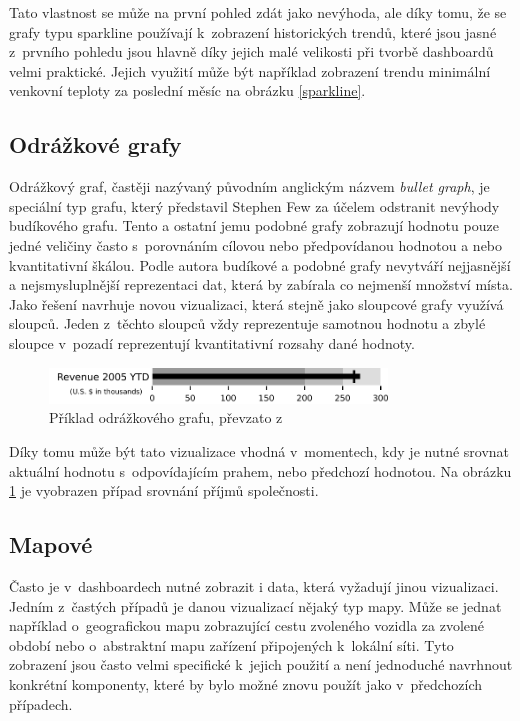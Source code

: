 Tato vlastnost se může na první pohled zdát jako nevýhoda, ale díky tomu, že se grafy typu sparkline používají k~zobrazení historických trendů, které jsou jasné z~prvního pohledu jsou hlavně díky jejich malé velikosti při tvorbě dashboardů velmi praktické. Jejich využití může být například zobrazení trendu minimální venkovní teploty za poslední měsíc na obrázku \ref{sparkline}.

\subsection*{Odrážkové grafy}
Odrážkový graf, častěji nazývaný původním anglickým názvem \textit{bullet graph}, je speciální typ grafu, který představil Stephen Few \cite{few2004dashboard} za účelem odstranit nevýhody budíkového grafu. Tento a ostatní jemu podobné grafy zobrazují hodnotu pouze jedné veličiny často s~porovnáním cílovou nebo předpovídanou hodnotou a nebo kvantitativní škálou. Podle autora budíkové a podobné grafy nevytváří nejjasnější a nejsmysluplnější reprezentaci dat, která by zabírala co nejmenší množství místa. Jako řešení navrhuje novou vizualizaci, která stejně jako sloupcové grafy využívá sloupců. Jeden z~těchto sloupců vždy reprezentuje samotnou hodnotu a zbylé sloupce v~pozadí reprezentují kvantitativní rozsahy dané hodnoty.

\begin{figure}[H]
\label{Bullet_Graph_Example}
\begin{center}
    \includegraphics[width=0.8\textwidth]{obrazky-figures/Bullet_Graph_Example.pdf}
\end{center}
\caption{Příklad odrážkového grafu, převzato z~\cite{few2004dashboard}}
\end{figure}

Díky tomu může být tato vizualizace vhodná v~momentech, kdy je nutné srovnat aktuální hodnotu s~odpovídajícím prahem, nebo předchozí hodnotou. Na obrázku \ref{Bullet_Graph_Example} je vyobrazen případ srovnání příjmů společnosti.

\subsection*{Mapové}
Často je v~dashboardech nutné zobrazit i data, která vyžadují jinou vizualizaci. Jedním z~častých případů je danou vizualizací nějaký typ mapy. Může se jednat například o~geografickou mapu zobrazující cestu zvoleného vozidla za zvolené období nebo o~abstraktní mapu zařízení připojených k~lokální síti. Tyto zobrazení jsou často velmi specifické k~jejich použití a není jednoduché navrhnout konkrétní komponenty, které by bylo možné znovu použít jako v~předchozích případech. 

